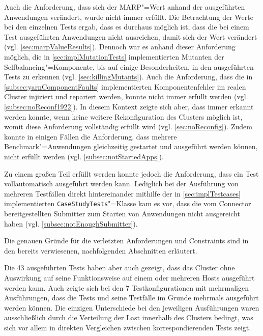 Auch die Anforderung, dass sich der MARP"=Wert anhand der ausgeführten Anwendungen verändert, wurde nicht immer erfüllt.
Die Betrachtung der Werte bei den einzelnen Tests ergab, dass es durchaus möglich ist, dass die bei einem Test ausgeführten Anwendungen nicht ausreichen, damit sich der Wert verändert (vgl. \cref{sec:marpValueResults}).
Dennoch war es anhand dieser Anforderung möglich, die in \cref{sec:implMutationTests} implementierten Mutanten der Selfbalancing"=Komponente, bis auf einige Besonderheiten, in den ausgeführten Tests zu erkennen (vgl. \cref{sec:killingMutants}).
Auch die Anforderung, dass die in \cref{subsec:yarnComponentFaults} implementierten Komponentenfehler im realen Cluster injiziert und repariert werden, konnte nicht immer erfüllt werden (vgl. \cref{subsec:noReconf1922}).
In diesem Kontext zeigte sich aber, dass immer erkannt werden konnte, wenn keine weitere Rekonfiguration des Clusters möglich ist, womit diese Anforderung vollständig erfüllt wird (vgl. \cref{sec:noReconfig}).
Zudem konnte in einigen Fällen die Anforderung, dass mehrere Benchmark"=Anwendungen gleichzeitig gestartet und ausgeführt werden können, nicht erfüllt werden (vgl. \cref{subsec:notStartedApps}).

Zu einem großen Teil erfüllt werden konnte jedoch die Anforderung, dass ein Test vollautomatisch ausgeführt werden kann.
Lediglich bei der Ausführung von mehreren Testfällen direkt hintereinander mithilfe der in \cref{sec:implTestcases} implementierten \texttt{CaseStudyTests}"=Klasse kam es vor, dass die vom Connector bereitgestellten Submitter zum Starten von Anwendungen nicht ausgereicht haben (vgl. \cref{subsec:notEnoughSubmitter}).

Die genauen Gründe für die verletzten Anforderungen und Constraints sind in den bereits verwiesenen, nachfolgenden Abschnitten erläutert.

Die 43 ausgeführten Tests haben aber auch gezeigt, dass das Cluster ohne Auswirkung auf seine Funktionsweise auf einem oder mehreren Hosts ausgeführt werden kann.
Auch zeigte sich bei den 7 Testkonfigurationen mit mehrmaligen Ausführungen, dass die Tests und seine Testfälle im Grunde mehrmals ausgeführt werden können.
Die einzigen Unterschiede bei den jeweiligen Ausführungen waren ausschließlich durch die Verteilung der Last innerhalb des Clusters bedingt, was sich vor allem in direkten Vergleichen zwischen korrespondierenden Tests zeigt.
